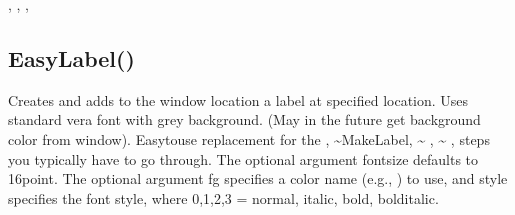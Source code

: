 \documentclass[letterpaper,10pt,english]{sphinxmanual}
\begin{document}
\sphinxAtStartPar
{}

\sphinxAtStartPar
{}, , , 

\ignorespaces 

\subsection{EasyLabel()}
\label{\detokenize{reference/utility:easylabel}}\label{\detokenize{reference/utility:index-6}}
\sphinxAtStartPar
{}

\sphinxAtStartPar
Creates and adds to the window location a label   at specified location. Uses standard vera font with grey background.    (May in the future get background color from window).   Easy\sphinxhyphen{}to\sphinxhyphen{}use replacement for the ,  \textasciitilde{}\textasciigrave{}\textasciigrave{}MakeLabel\textasciigrave{}\textasciigrave{},  \textasciitilde{} , \textasciitilde{} , steps you typically have to go through.    The optional argument fontsize defaults to 16\sphinxhyphen{}point.  The optional argument fg specifies a color name (e.g., ) to use, and style specifies the font style, where 0,1,2,3 = normal, italic, bold, bolditalic.

\sphinxAtStartPar
{}

\begin{sphinxVerbatim}[commandchars=\\\{\}]
\end{sphinxVerbatim}

\sphinxAtStartPar
{}

\begin{sphinxVerbatim}[commandchars=\\\{\}]
\end{sphinxVerbatim}
\end{document}
